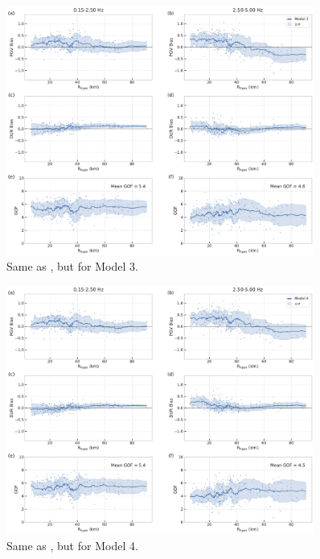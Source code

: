 \begin{figure}[!ht]
  \centering
  \includegraphics[width=0.9\textwidth,height=0.9\textheight,keepaspectratio]{figures/figure_highf_S13.pdf}
  \caption{Same as , but for Model 3.
  }
\label{fig:highf-A13}
\end{figure}
\clearpage


\begin{figure}[!ht]
  \centering
  \includegraphics[width=0.9\textwidth,height=0.9\textheight,keepaspectratio]{figures/figure_highf_S14.pdf}
  \caption{Same as , but for Model 4.
  }
\label{fig:highf-A14}
\end{figure}
\clearpage


